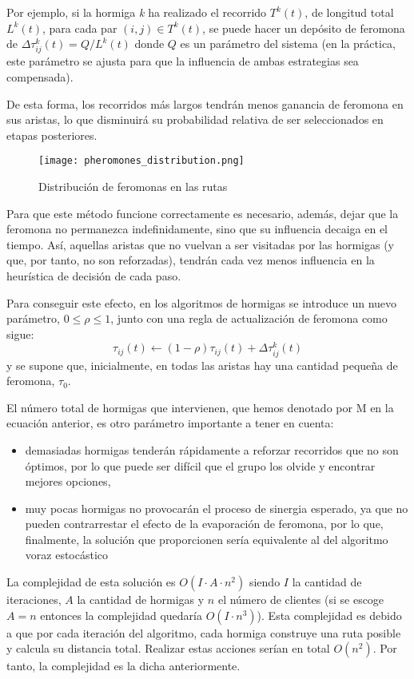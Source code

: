 \documentclass[twocolumn, fontsize=10pt]{article}
\theoremstyle{definition} %
\begin{document}
Por ejemplo, si la hormiga \textit{k} ha realizado el recorrido \(T^k(t)\), de longitud total \(L^k(t)\), para cada par \((i,j) \in T^k(t)\), se puede hacer un depósito de feromona de \(\Delta \tau_{ij}^k(t) = Q/L^k(t)\) donde \(Q\) es un parámetro del sistema (en la práctica, este parámetro se ajusta para que la influencia de ambas estrategias sea compensada). \cite{ant}


De esta forma, los recorridos más largos tendrán menos ganancia de feromona en sus aristas, lo que disminuirá su probabilidad relativa de ser seleccionados en etapas posteriores. 

\begin{figure}[h]
    \centering
    \texttt{[image: pheromones\_distribution.png]}
    \caption{Distribución de feromonas en las rutas}
    \label{fig:gadget}
\end{figure}

Para que este método funcione correctamente es necesario, además, dejar que la feromona no permanezca indefinidamente, sino que su influencia decaiga en el tiempo. Así, aquellas aristas que no vuelvan a ser visitadas por las hormigas (y que, por tanto, no son reforzadas), tendrán cada vez menos influencia en la heurística de decisión de cada paso.

Para conseguir este efecto, en los algoritmos de hormigas se introduce un nuevo parámetro, \(0 \leq \rho \leq 1\), junto con una regla de actualización de feromona como sigue:
\[\tau_{ij}(t) \longleftarrow (1-\rho)\tau_{ij}(t) +  \Delta \tau_{ij}^k(t)\]
y se supone que, inicialmente, en todas las aristas hay una cantidad pequeña de feromona, \(\tau_0\).

El número total de hormigas que intervienen, que hemos denotado por {M} en la ecuación anterior, es otro parámetro importante a tener en cuenta:
\begin{itemize}
    \item demasiadas hormigas tenderán rápidamente a reforzar recorridos que no son óptimos, por lo que puede ser difícil que el grupo los olvide y encontrar mejores opciones,
    \item muy pocas hormigas no provocarán el proceso de sinergia esperado, ya que no pueden contrarrestar el efecto de la evaporación de feromona, por lo que, finalmente, la solución que proporcionen sería equivalente al del algoritmo voraz estocástico \cite{ant}
\end{itemize}

La complejidad de esta solución es \(O(I \cdot A \cdot n^2)\) siendo \(I\) la cantidad de iteraciones, \(A\) la cantidad de hormigas y \(n\) el número de clientes (si se escoge \(A=n\) entonces la complejidad quedaría \(O(I \cdot n^3)\)). Esta complejidad es debido a que por cada iteración del algoritmo, cada hormiga construye una ruta posible y calcula su distancia total. Realizar estas acciones serían en total \(O(n^2)\). Por tanto, la complejidad es la dicha anteriormente.
\end{document}
